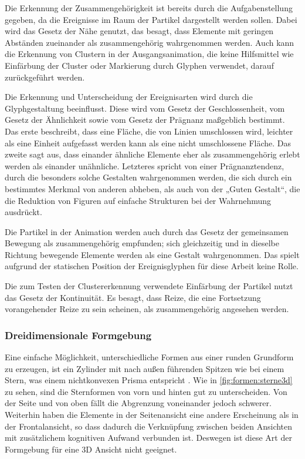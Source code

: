 Die Erkennung der Zusammengehörigkeit ist bereits durch die Aufgabenstellung gegeben, da die Ereignisse im Raum der Partikel dargestellt werden sollen. Dabei wird das Gesetz der Nähe genutzt, das besagt, dass Elemente mit geringen Abständen zueinander als zusammengehörig wahrgenommen werden. Auch kann die Erkennung von Clustern in der Ausgangsanimation, die keine Hilfsmittel wie Einfärbung der Cluster oder Markierung durch Glyphen verwendet, darauf zurückgeführt werden.

Die Erkennung und Unterscheidung der Ereignisarten wird durch die Glyphgestaltung beeinflusst. Diese wird vom Gesetz der Geschlossenheit, vom Gesetz der Ähnlichkeit sowie vom Gesetz der Prägnanz maßgeblich bestimmt. Das erste beschreibt, dass eine Fläche, die von Linien umschlossen wird, leichter als eine Einheit aufgefasst werden kann als eine nicht umschlossene Fläche. Das zweite sagt aus, dass einander ähnliche Elemente eher als zusammengehörig erlebt werden als einander unähnliche. Letzteres spricht von einer Prägnanztendenz, durch die besonders solche Gestalten wahrgenommen werden, die sich durch ein bestimmtes Merkmal von anderen abheben, als auch von der „Guten Gestalt“, die die Reduktion von Figuren auf einfache Strukturen bei der Wahrnehmung ausdrückt.

Die Partikel in der Animation werden auch durch das Gesetz der gemeinsamen Bewegung als zusammengehörig empfunden; sich gleichzeitig und in dieselbe Richtung bewegende Elemente werden als eine Gestalt wahrgenommen. Das spielt aufgrund der statischen Position der Ereignisglyphen für diese Arbeit keine Rolle.

Die zum Testen der Clustererkennung verwendete Einfärbung der Partikel nutzt das Gesetz der Kontinuität. Es besagt, dass Reize, die eine Fortsetzung vorangehender Reize zu sein scheinen, als zusammengehörig angesehen werden.



\subsubsection{Dreidimensionale Formgebung}\label{sec:grundlagen:formgebung}
Eine einfache Möglichkeit, unterschiedliche Formen aus einer runden Grundform zu erzeugen, ist ein Zylinder mit nach außen führenden Spitzen wie bei einem Stern, was einem nichtkonvexen Prisma entspricht \cite{UniformPolyhedra}. Wie in \autoref{fig:formen:sterne3d} zu sehen, sind die Sternformen von vorn und hinten gut zu unterscheiden. Von der Seite und von oben fällt die Abgrenzung voneinander jedoch schwerer. Weiterhin haben die Elemente in der Seitenansicht eine andere Erscheinung als in der Frontalansicht, so dass dadurch die Verknüpfung zwischen beiden Ansichten mit zusätzlichem kognitiven Aufwand verbunden ist. Deswegen ist diese Art der Formgebung für eine 3D Ansicht nicht geeignet.

